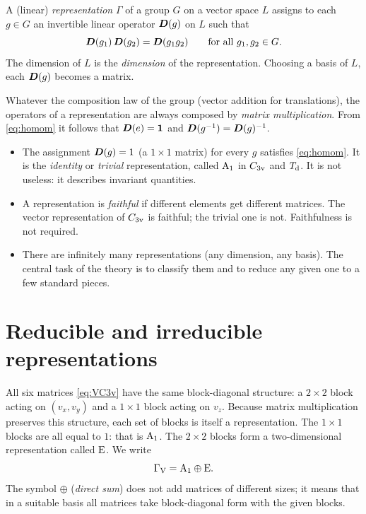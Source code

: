 \begin{definition}
A (linear) \emph{representation} $\Gamma$ of a group $G$ on a vector space $L$
assigns to each $g\in G$ an invertible linear operator $\bm{D}(g)$ on $L$ such that
\begin{equation}\label{eq:homom}
  \bm{D}(g_1)\,\bm{D}(g_2)=\bm{D}(g_1 g_2)\qquad\text{for all } g_1,g_2\in G.
\end{equation}
The dimension of $L$ is the \emph{dimension} of the representation. Choosing a basis
of $L$, each $\bm{D}(g)$ becomes a matrix.
\end{definition}
Whatever the composition law of the group (vector addition for translations), the
operators of a representation are always composed by \emph{matrix multiplication}.
From \eqref{eq:homom} it follows that $\bm{D}(e)=\bm{1}$ and
$\bm{D}(g^{-1})=\bm{D}(g)^{-1}$.

\begin{itemize}
\item The assignment $\bm{D}(g)=1$ (a $1\times1$ matrix) for every $g$ satisfies
      \eqref{eq:homom}. It is the \emph{identity} or \emph{trivial} representation,
      called $\mathrm{A}_1$ in $C_{3\mathrm{v}}$ and $T_{\mathrm{d}}$. It is not useless: it describes
      invariant quantities.
\item A representation is \emph{faithful} if different elements get different
      matrices. The vector representation of $C_{3\mathrm{v}}$ is faithful; the trivial one is
      not. Faithfulness is not required.
\item There are infinitely many representations (any dimension, any basis). The
      central task of the theory is to classify them and to reduce any given one to
      a few standard pieces.
\end{itemize}

\section{Reducible and irreducible representations}\label{sec:reducible}

All six matrices \eqref{eq:VC3v} have the same block-diagonal structure: a $2\times2$
block acting on $(v_x,v_y)$ and a $1\times1$ block acting on $v_z$. Because matrix
multiplication preserves this structure, each set of blocks is itself a
representation. The $1\times1$ blocks are all equal to $1$: that is $\mathrm{A}_1$. The
$2\times2$ blocks form a two-dimensional representation called $\mathrm{E}$. We write
\begin{equation}
  \Gamma_{\mathrm{V}}=\mathrm{A}_1\oplus\mathrm{E}.
\end{equation}
The symbol $\oplus$ (\emph{direct sum}) does not add matrices of different sizes; it
means that in a suitable basis all matrices take block-diagonal form with the given
blocks.

